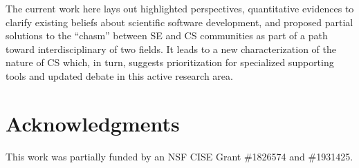 \documentclass[sigconf,review,anonymous]{acmart}
\begin{document}
The current work here lays out highlighted perspectives, quantitative evidences to clarify existing beliefs about scientific software development, and proposed partial solutions to the ``chasm'' between SE and CS communities as part of a path toward interdisciplinary of two fields. It leads to a new characterization of the nature of CS which, in turn, suggests prioritization for specialized supporting tools and updated debate in this active research area. 



\section{Acknowledgments}

This work was partially funded by an NSF CISE Grant \#1826574 and \#1931425.

\balance


\end{document}
